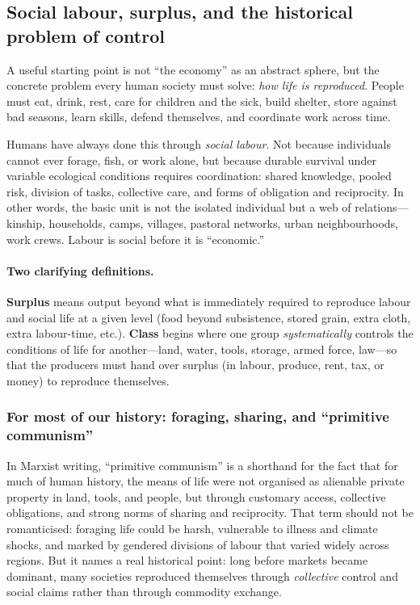 \subsection{Social labour, surplus, and the historical problem of control}
\label{sec:sociallabour-surplus-control}

A useful starting point is not ``the economy'' as an abstract sphere, but the concrete problem
every human society must solve: \emph{how life is reproduced}. People must eat, drink, rest,
care for children and the sick, build shelter, store against bad seasons, learn skills, defend
themselves, and coordinate work across time.

Humans have always done this through \emph{social labour}. Not because individuals cannot ever
forage, fish, or work alone, but because durable survival under variable ecological conditions
requires coordination: shared knowledge, pooled risk, division of tasks, collective care, and
forms of obligation and reciprocity.\cite{LeeDaly1999} In other words, the basic unit is not the
isolated individual but a web of relations---kinship, households, camps, villages, pastoral networks,
urban neighbourhoods, work crews. Labour is social before it is ``economic.''

\paragraph{Two clarifying definitions.}
\textbf{Surplus} means output beyond what is immediately required to reproduce labour and social life
at a given level (food beyond subsistence, stored grain, extra cloth, extra labour-time, etc.).
\textbf{Class} begins where one group \emph{systematically} controls the conditions of life for another---land,
water, tools, storage, armed force, law---so that the producers must hand over surplus (in labour, produce,
rent, tax, or money) to reproduce themselves.

\subsubsection{For most of our history: foraging, sharing, and ``primitive communism''}
\label{sec:foraging-primitive-communism}

In Marxist writing, ``primitive communism'' is a shorthand for the fact that for much of human history,
the means of life were not organised as alienable private property in land, tools, and people, but through
customary access, collective obligations, and strong norms of sharing and reciprocity. That term should not
be romanticised: foraging life could be harsh, vulnerable to illness and climate shocks, and marked by
gendered divisions of labour that varied widely across regions. But it names a real historical point:
long before markets became dominant, many societies reproduced themselves through \emph{collective} control
and social claims rather than through commodity exchange.\cite{LeeDaly1999,Woodburn1982,Boehm1999}

